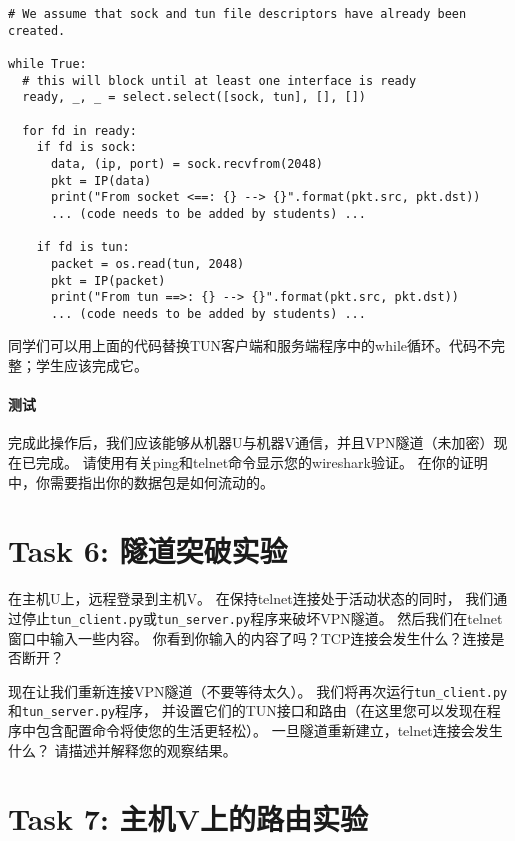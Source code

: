 \begin{lstlisting}
# We assume that sock and tun file descriptors have already been created.

while True:
  # this will block until at least one interface is ready
  ready, _, _ = select.select([sock, tun], [], [])

  for fd in ready:
    if fd is sock:
      data, (ip, port) = sock.recvfrom(2048)
      pkt = IP(data)
      print("From socket <==: {} --> {}".format(pkt.src, pkt.dst))
      ... (code needs to be added by students) ...

    if fd is tun:
      packet = os.read(tun, 2048)
      pkt = IP(packet)
      print("From tun ==>: {} --> {}".format(pkt.src, pkt.dst))
      ... (code needs to be added by students) ...
\end{lstlisting}

同学们可以用上面的代码替换TUN客户端和服务端程序中的while循环。代码不完整；学生应该完成它。

\paragraph{测试} 完成此操作后，我们应该能够从机器U与机器V通信，并且VPN隧道（未加密）现在已完成。
请使用有关ping和telnet命令显示您的wireshark验证。 
在你的证明中，你需要指出你的数据包是如何流动的。


\section{Task 6: 隧道突破实验} 

在主机U上，远程登录到主机V。
在保持telnet连接处于活动状态的同时，
我们通过停止\verb|tun_client.py|或\verb|tun_server.py|程序来破坏VPN隧道。 
然后我们在telnet窗口中输入一些内容。 
你看到你输入的内容了吗？TCP连接会发生什么？连接是否断开？ 

现在让我们重新连接VPN隧道（不要等待太久）。 
我们将再次运行\verb|tun_client.py|和\verb|tun_server.py|程序，
并设置它们的TUN接口和路由（在这里您可以发现在程序中包含配置命令将使您的生活更轻松）。
一旦隧道重新建立，telnet连接会发生什么？ 
请描述并解释您的观察结果。


\section{Task 7: 主机V上的路由实验} 

